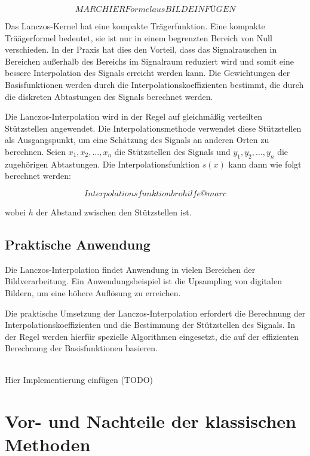\begin{equation}
MARC HIER Formel aus BILD EINFÜGEN
\end{equation}

Das Lanczos-Kernel hat eine kompakte Trägerfunktion.
Eine kompakte Träägerformel bedeutet, sie ist nur in einem begrenzten Bereich von Null verschieden. In der Praxis hat dies den Vorteil, dass das Signalrauschen in Bereichen außerhalb des Bereichs im Signalraum reduziert wird und somit eine bessere Interpolation des Signals erreicht werden kann.
Die Gewichtungen der Basisfunktionen werden durch die Interpolationskoeffizienten bestimmt, die durch die diskreten Abtastungen des Signals berechnet werden.

Die Lanczos-Interpolation wird in der Regel auf gleichmäßig verteilten Stützstellen angewendet. 
Die Interpolationsmethode verwendet diese Stützstellen als Ausgangspunkt, um eine Schätzung des Signals an anderen Orten zu berechnen. 
Seien $x_1, x_2, \ldots, x_n$ die Stützstellen des Signals und $y_1, y_2, \ldots, y_n$ die zugehörigen Abtastungen. Die Interpolationsfunktion $s(x)$ kann dann wie folgt berechnet werden:

\begin{equation}
Interpolationsfunktion bro hilfe @marc
\end{equation}

wobei $h$ der Abstand zwischen den Stützstellen ist.

\subsection{Praktische Anwendung}

Die Lanczos-Interpolation findet Anwendung in vielen Bereichen der Bildverarbeitung. 
Ein Anwendungsbeispiel ist die Upsampling von digitalen Bildern, um eine höhere Auflösung zu erreichen.

Die praktische Umsetzung der Lanczos-Interpolation erfordert die Berechnung der Interpolationskoeffizienten und die Bestimmung der Stützstellen des Signals. In der Regel werden hierfür spezielle Algorithmen eingesetzt, die auf der effizienten Berechnung der Basisfunktionen basieren.

\\Hier Implementierung einfügen (TODO) 

\section{Vor- und Nachteile der klassischen Methoden}

\newpage
